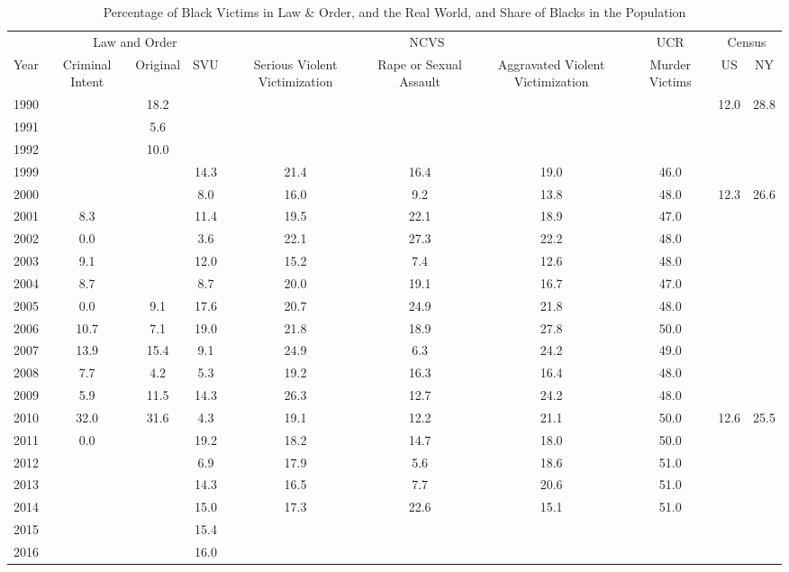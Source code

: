 \begin{table}[!htb]
\centering
\caption{Percentage of Black Victims in Law \& Order, and the Real World, and Share of Blacks in the Population} 
\label{tab:v_race}
\begingroup\tiny
\begin{tabular}{cccccccccc}
  \toprule
   & \multicolumn{3}{c}{{Law and Order}} & \multicolumn{3}{c}{{NCVS}} & \multicolumn{1}{c}{{UCR}} & \multicolumn{2}{c}{{Census}}\\
 \cmidrule(lr){2-4}\cmidrule(lr){5-7}\cmidrule(lr){9-10}
 {Year} & {Criminal Intent} & {Original} & {SVU} & {Serious Violent Victimization} & {Rape or Sexual Assault} & {Aggravated Violent Victimization} & {Murder Victims} & {US} & {NY}\\
 \midrule
1990 &  & 18.2 &  &  &  &  &  & 12.0 & 28.8 \\ 
  1991 &  & 5.6 &  &  &  &  &  &  &  \\ 
  1992 &  & 10.0 &  &  &  &  &  &  &  \\ 
  1999 &  &  & 14.3 & 21.4 & 16.4 & 19.0 & 46.0 &  &  \\ 
  2000 &  &  & 8.0 & 16.0 & 9.2 & 13.8 & 48.0 & 12.3 & 26.6 \\ 
  2001 & 8.3 &  & 11.4 & 19.5 & 22.1 & 18.9 & 47.0 &  &  \\ 
  2002 & 0.0 &  & 3.6 & 22.1 & 27.3 & 22.2 & 48.0 &  &  \\ 
  2003 & 9.1 &  & 12.0 & 15.2 & 7.4 & 12.6 & 48.0 &  &  \\ 
  2004 & 8.7 &  & 8.7 & 20.0 & 19.1 & 16.7 & 47.0 &  &  \\ 
  2005 & 0.0 & 9.1 & 17.6 & 20.7 & 24.9 & 21.8 & 48.0 &  &  \\ 
  2006 & 10.7 & 7.1 & 19.0 & 21.8 & 18.9 & 27.8 & 50.0 &  &  \\ 
  2007 & 13.9 & 15.4 & 9.1 & 24.9 & 6.3 & 24.2 & 49.0 &  &  \\ 
  2008 & 7.7 & 4.2 & 5.3 & 19.2 & 16.3 & 16.4 & 48.0 &  &  \\ 
  2009 & 5.9 & 11.5 & 14.3 & 26.3 & 12.7 & 24.2 & 48.0 &  &  \\ 
  2010 & 32.0 & 31.6 & 4.3 & 19.1 & 12.2 & 21.1 & 50.0 & 12.6 & 25.5 \\ 
  2011 & 0.0 &  & 19.2 & 18.2 & 14.7 & 18.0 & 50.0 &  &  \\ 
  2012 &  &  & 6.9 & 17.9 & 5.6 & 18.6 & 51.0 &  &  \\ 
  2013 &  &  & 14.3 & 16.5 & 7.7 & 20.6 & 51.0 &  &  \\ 
  2014 &  &  & 15.0 & 17.3 & 22.6 & 15.1 & 51.0 &  &  \\ 
  2015 &  &  & 15.4 &  &  &  &  &  &  \\ 
  2016 &  &  & 16.0 &  &  &  &  &  &  \\ 
   \bottomrule
\end{tabular}
\endgroup
\end{table}
